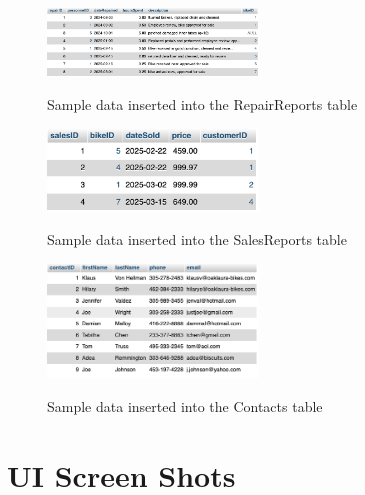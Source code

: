 \documentclass{article}
\begin{document}
\begin{figure}[H]
    \centering
    \caption{Sample data inserted into the RepairReports table}
    \vspace{0.2cm}
    \includegraphics[width=0.5\textwidth]{RepairReports.png}
    \label{fig:RepairReports}
\end{figure}

\begin{figure}[H]
    \centering
    \caption{Sample data inserted into the SalesReports table}
    \vspace{0.2cm}
    \includegraphics[width=0.5\textwidth]{SalesReports.png}
    \label{fig:SalesReports}
\end{figure}

\begin{figure}[H]
    \centering
    \caption{Sample data inserted into the Contacts table}
    \vspace{0.2cm}
    \includegraphics[width=0.5\textwidth]{Contacts.png}
    \label{fig:Contacts}
\end{figure}

\section{UI Screen Shots}
\end{document}
